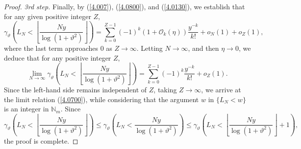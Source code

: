 \documentclass[final,1p,times]{elsarticle}
\numberwithin{equation}{section}
\begin{document}
\begin{proof}
\textit{3rd step.} Finally, by (\ref{4.007}), (\ref{4.0800}), and (\ref{4.0130}), we establish that for any given positive integer \( Z \),
\[
\gamma_{\vartheta} \left( L_N < \left\lfloor \frac{N y}{\log(1+\vartheta^2)} \right\rfloor \right) = \sum_{k=0}^{Z-1} (-1)^k \left( 1 + \mathcal{O}_k(\eta) \right) \frac{y^{-k}}{k!} + o_N(1) + o_Z(1),
\]
where the last term approaches 0 as \( Z \to \infty \). Letting \( N \to \infty \), and then \( \eta \to 0 \), we deduce that for any positive integer \( Z \),
\[
\lim_{N \to \infty} \gamma_{\vartheta} \left( L_N < \left\lfloor \frac{N y}{\log(1+\vartheta^2)} \right\rfloor \right) = \sum_{k=0}^{Z-1} (-1)^k \frac{y^{-k}}{k!} + o_Z(1).
\]
Since the left-hand side remains independent of \( Z \), taking \( Z \to \infty \), we arrive at the limit relation (\ref{4.0700}), while considering that the argument \( w \) in \( \{L_N < w\} \) is an integer in \( \mathbb{N}_m \). Since
\[
\gamma_{\vartheta} \left( L_N < \left\lfloor \frac{N y}{\log(1+\vartheta^2)} \right\rfloor \right)
\leq
\gamma_{\vartheta} \left( L_N < \frac{N y}{\log(1+\vartheta^2)} \right)
\leq
\gamma_{\vartheta} \left( L_N < \left\lfloor \frac{N y}{\log(1+\vartheta^2)} \right\rfloor + 1 \right),
\]
the proof is complete.
\end{proof}
%
\end{document}
